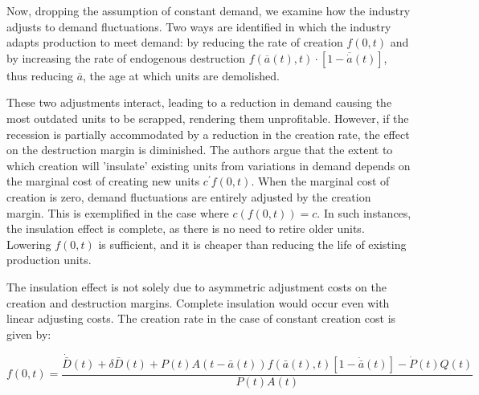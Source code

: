 \documentclass[12pt]{report}
\begin{document}
Now, dropping the assumption of constant demand, we examine how the industry adjusts to demand fluctuations. Two ways
are identified in which the industry adapts production to meet demand: by reducing the rate of creation \(f(0,t)\) and
by increasing the rate of endogenous destruction \(f(\overline{a}(t),t) \cdot [1-\overline{\dot{a}}(t)]\), thus reducing
\(\overline{a}\), the age at which units are demolished. 

These two adjustments interact, leading to a reduction in demand causing the most outdated units to be scrapped,
rendering them unprofitable. However, if the recession is partially accommodated by a reduction in the creation rate,
the effect on the destruction margin is diminished. The authors argue that the extent to which creation will 'insulate'
existing units from variations in demand depends on the marginal cost of creating new units \(c^{\prime}f(0,t)\). When the
marginal cost of creation is zero, demand fluctuations are entirely adjusted by the creation margin. This is exemplified
in the case where \(c(f(0,t)) = c\). In such instances, the insulation effect is complete, as there is no need to retire
older units. Lowering \(f(0,t)\) is sufficient, and it is cheaper than reducing the life of existing production units. 

The insulation effect is not solely due to asymmetric adjustment costs on the creation and destruction margins. Complete
insulation would occur even with linear adjusting costs. The creation rate in the case of constant creation cost is
given by: 

\[\label{eq_2.10} f(0, t) = \frac{\dot{\bar{D}}(t) + \delta \bar{D}(t) + P(t) A(t - \bar{a}(t)) f(\bar{a}(t), t)[1 -
\dot{\bar{a}}(t)] - \dot{P}(t) Q(t)}{P(t) A(t)}\] 
\end{document}
